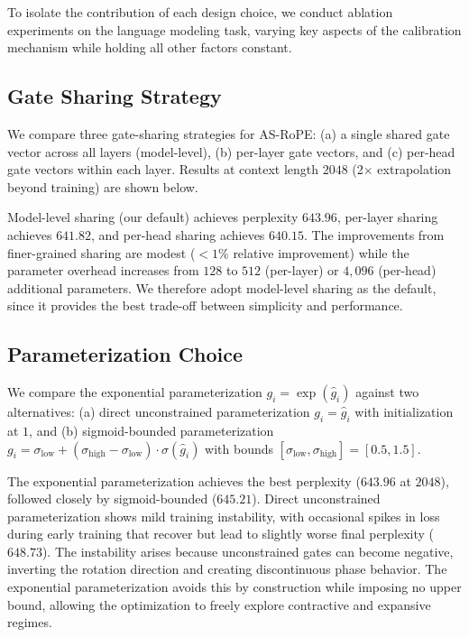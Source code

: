 \documentclass[conference]{IEEEtran}
\begin{document}
To isolate the contribution of each design choice, we conduct ablation experiments on the language modeling task, varying key aspects of the calibration mechanism while holding all other factors constant.

\subsection{Gate Sharing Strategy}
We compare three gate-sharing strategies for AS-RoPE: (a) a single shared gate vector across all layers (model-level), (b) per-layer gate vectors, and (c) per-head gate vectors within each layer. Results at context length $2048$ (2$\times$ extrapolation beyond training) are shown below.

Model-level sharing (our default) achieves perplexity $643.96$, per-layer sharing achieves $641.82$, and per-head sharing achieves $640.15$. The improvements from finer-grained sharing are modest ($<1\%$ relative improvement) while the parameter overhead increases from $128$ to $512$ (per-layer) or $4{,}096$ (per-head) additional parameters. We therefore adopt model-level sharing as the default, since it provides the best trade-off between simplicity and performance.

\subsection{Parameterization Choice}
We compare the exponential parameterization $g_i = \exp(\hat{g}_i)$ against two alternatives: (a) direct unconstrained parameterization $g_i = \hat{g}_i$ with initialization at $1$, and (b) sigmoid-bounded parameterization $g_i = \sigma_{\text{low}} + (\sigma_{\text{high}} - \sigma_{\text{low}}) \cdot \sigma(\hat{g}_i)$ with bounds $[\sigma_{\text{low}}, \sigma_{\text{high}}] = [0.5, 1.5]$.

The exponential parameterization achieves the best perplexity ($643.96$ at $2048$), followed closely by sigmoid-bounded ($645.21$). Direct unconstrained parameterization shows mild training instability, with occasional spikes in loss during early training that recover but lead to slightly worse final perplexity ($648.73$). The instability arises because unconstrained gates can become negative, inverting the rotation direction and creating discontinuous phase behavior. The exponential parameterization avoids this by construction while imposing no upper bound, allowing the optimization to freely explore contractive and expansive regimes.
\end{document}
